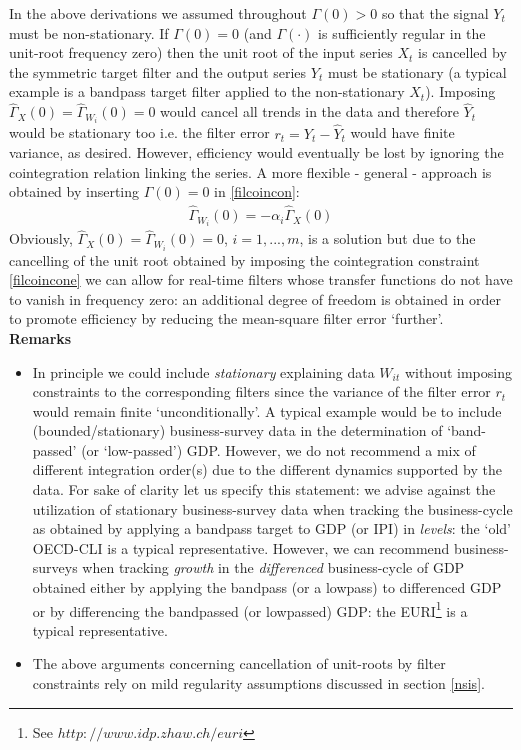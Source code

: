 \documentclass[11pt]{article}
\begin{document}
In the above derivations we assumed throughout $\Gamma(0)>0$ so that the  signal $Y_t$ must be non-stationary. If $\Gamma(0)=0$ (and
$\Gamma(\cdot)$ is sufficiently regular in the unit-root frequency zero) then the
unit root of the input series $X_t$ is cancelled by the symmetric target filter and the
output series $Y_t$ must be stationary (a typical example is a bandpass target filter applied to the non-stationary $X_t$). Imposing $\hat{\Gamma}_X(0)=\hat{\Gamma}_{W_i}(0)=0$ would cancel all trends in the data and therefore $\hat{Y}_t$ would be stationary too i.e. the filter error $r_t=Y_{t}-\hat{Y}_t$ would have finite variance, as desired.  However, efficiency
would eventually be lost by ignoring the cointegration relation
linking the series. A more flexible -  general - approach is obtained by inserting $\Gamma(0)=0$ in   \ref{filcoincon}:
\begin{eqnarray}\label{filcoincone}
\hat{\Gamma}_{W_i}(0)=-\alpha_i\hat{\Gamma}_X(0)
\end{eqnarray}
Obviously, $\hat{\Gamma}_X(0)=\hat{\Gamma}_{W_i}(0)=0$, $i=1,...,m$, is a solution but due to the
cancelling of the unit root obtained by imposing the cointegration constraint \ref{filcoincone} we can
allow for real-time filters whose transfer functions do not have to vanish
in frequency zero: an additional degree of freedom is obtained in order to promote efficiency by reducing the mean-square filter error `further'. \\

\textbf{Remarks}
\begin{itemize}
\item In principle we could include  \emph{stationary} explaining data $W_{it}$ without imposing constraints to the corresponding filters since the variance of the filter error $r_t$ would remain finite `unconditionally'. A typical example would be to include (bounded/stationary) business-survey
data in the determination of `band-passed' (or `low-passed') GDP. However, we do  not recommend a mix of different integration order(s) due to the different dynamics supported by the data. For sake of clarity let us specify this statement: we advise against the utilization of stationary business-survey data when tracking the business-cycle  as obtained by applying a bandpass target to GDP (or IPI) in \emph{levels}: the `old' OECD-CLI is a typical representative. However, we can recommend business-surveys when tracking \emph{growth} in the \emph{differenced} business-cycle of GDP obtained either by applying the bandpass (or a lowpass) to differenced GDP or by differencing the bandpassed (or lowpassed) GDP: the EURI\footnote{See $ http://www.idp.zhaw.ch/euri$} is a typical representative.
\item The above arguments concerning cancellation of unit-roots by filter constraints rely on mild regularity assumptions discussed in section \ref{nsis}. 
\end{itemize}
\end{document}
